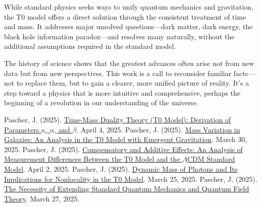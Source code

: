 \documentclass[a4paper,12pt]{article}
\begin{document}
	While standard physics seeks ways to unify quantum mechanics and gravitation, the T0 model offers a direct solution through the consistent treatment of time and mass. It addresses major unsolved questions—dark matter, dark energy, the black hole information paradox—and resolves many naturally, without the additional assumptions required in the standard model.
	
	The history of science shows that the greatest advances often arise not from new data but from new perspectives. This work is a call to reconsider familiar facts—not to replace them, but to gain a clearer, more unified picture of reality. It’s a step toward a physics that is more intuitive and comprehensive, perhaps the beginning of a revolution in our understanding of the universe.
	
	\begin{thebibliography}{99}
		 Pascher, J. (2025). \href{https://github.com/jpascher/T0-Time-Mass-Duality/tree/main/2/pdf/English/ZeitMasseT0ParamsEn.pdf}{Time-Mass Duality Theory (T0 Model): Derivation of Parameters \(\kappa\), \(\alpha\), and \(\beta\)}. April 4, 2025.
		 Pascher, J. (2025). \href{https://github.com/jpascher/T0-Time-Mass-Duality/tree/main/2/pdf/English/MassVarGalaxienEn.pdf}{Mass Variation in Galaxies: An Analysis in the T0 Model with Emergent Gravitation}. March 30, 2025.
		 Pascher, J. (2025). \href{https://github.com/jpascher/T0-Time-Mass-Duality/tree/main/2/pdf/English/MessdifferenzenT0StandardEn.pdf}{Compensatory and Additive Effects: An Analysis of Measurement Differences Between the T0 Model and the \(\Lambda\)CDM Standard Model}. April 2, 2025.
		 Pascher, J. (2025). \href{https://github.com/jpascher/T0-Time-Mass-Duality/tree/main/2/pdf/English/DynMassePhotonenNichtlokalEn.pdf}{Dynamic Mass of Photons and Its Implications for Nonlocality in the T0 Model}. March 25, 2025.
		 Pascher, J. (2025). \href{https://github.com/jpascher/T0-Time-Mass-Duality/tree/main/2/pdf/English/NotwendigkeitQMErweiterungEn.pdf}{The Necessity of Extending Standard Quantum Mechanics and Quantum Field Theory}. March 27, 2025.
	\end{thebibliography}
	
\end{document}
